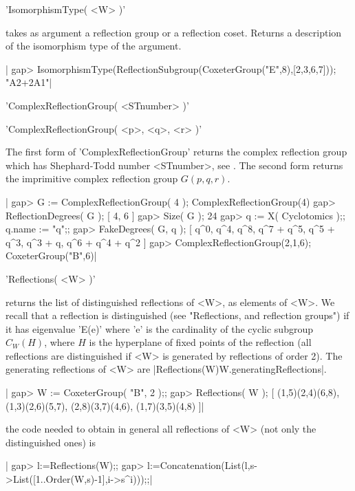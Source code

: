 'IsomorphismType( <W> )'

takes  as  argument  a  reflection  group  or a reflection coset. Returns a
description of the isomorphism type of the argument.

|    gap> IsomorphismType(ReflectionSubgroup(CoxeterGroup("E",8),[2,3,6,7]));
    "A2+2A1"|


'ComplexReflectionGroup( <STnumber> )'

'ComplexReflectionGroup( <p>, <q>, <r> )'

The first form of 'ComplexReflectionGroup' returns the complex reflection
group  which has Shephard-Todd  number  <STnumber>, see \cite{ST54}.  The
second form returns the imprimitive complex reflection group $G(p,q,r)$.

|    gap> G := ComplexReflectionGroup( 4 );
    ComplexReflectionGroup(4)
    gap> ReflectionDegrees( G );
    [ 4, 6 ]
    gap> Size( G );
    24
    gap> q := X( Cyclotomics );; q.name := "q";;
    gap> FakeDegrees( G, q );
    [ q^0, q^4, q^8, q^7 + q^5, q^5 + q^3, q^3 + q, q^6 + q^4 + q^2 ]
    gap> ComplexReflectionGroup(2,1,6);
    CoxeterGroup("B",6)|


'Reflections( <W> )'

returns  the list of distinguished reflections  of <W>, as elements of <W>.
We  recall  that  a  reflection  is  distinguished  (see  "Reflections, and
reflection   groups")  if  it  has  eigenvalue  'E(e)'  where  'e'  is  the
cardinality of the cyclic subgroup $C_W(H)$, where $H$ is the hyperplane of
fixed points of the reflection (all reflections are distinguished if <W> is
generated by reflections of order 2). The generating reflections of <W> are
|Reflections(W){W.generatingReflections}|.

|    gap> W := CoxeterGroup( "B", 2 );;
    gap> Reflections( W );
    [ (1,5)(2,4)(6,8), (1,3)(2,6)(5,7), (2,8)(3,7)(4,6), (1,7)(3,5)(4,8) ]|

the  code needed to obtain in general  all reflections of <W> (not only the
distinguished ones) is\:

|    gap> l:=Reflections(W);;
    gap> l:=Concatenation(List(l,s->List([1..Order(W,s)-1],i->s^i)));;|

